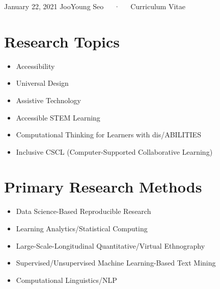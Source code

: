 \documentclass[11pt, a4paper]{awesome-cv}
\providecommand{\tightlist}{%
	\setlength{\itemsep}{0pt}\setlength{\parskip}{0pt}}
\begin{document}
\makecvheader

\makecvfooter
  {January 22, 2021}
    {JooYoung Seo~~~·~~~Curriculum Vitae}
  {\thepage}





\hypertarget{research-topics}{%
\section{Research Topics}\label{research-topics}}

\begin{itemize}
\tightlist
\item
  Accessibility
\item
  Universal Design
\item
  Assistive Technology
\item
  Accessible STEM Learning
\item
  Computational Thinking for Learners with dis/ABILITIES
\item
  Inclusive CSCL (Computer-Supported Collaborative Learning)
\end{itemize}

\hypertarget{primary-research-methods}{%
\section{Primary Research Methods}\label{primary-research-methods}}

\begin{itemize}
\tightlist
\item
  Data Science-Based Reproducible Research
\item
  Learning Analytics/Statistical Computing
\item
  Large-Scale-Longitudinal Quantitative/Virtual Ethnography
\item
  Supervised/Unsupervised Machine Learning-Based Text Mining
\item
  Computational Linguistics/NLP
\end{itemize}
\end{document}
